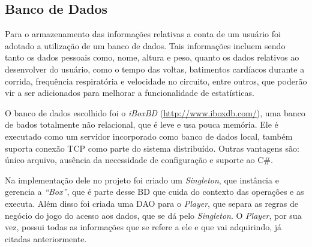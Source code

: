 \subsection{Banco de Dados}
Para o armazenamento das informações relativas a conta de um usuário foi adotado a utilização de um banco de dados. Tais informações incluem sendo tanto os dados pessoais como, nome, altura e peso, quanto os dados relativos ao desenvolver do usuário, como o tempo das voltas, batimentos cardíacos durante a corrida, frequência respiratória e velocidade no circuito, entre outros, que poderão vir a ser adicionados para melhorar a funcionalidade de estatísticas.

O banco de dados escolhido foi o \textit{iBoxBD} (\url{http://www.iboxdb.com/}), uma banco de bados totalmente não relacional, que é leve e usa pouca memória. Ele é executado como um servidor incorporado como banco de dados local, também suporta conexão TCP como parte do sistema distribuído. Outras vantagens são: único arquivo, ausência da necessidade de configuração e suporte ao C\#.

Na implementação dele no projeto foi criado um \textit{Singleton}, que instância e gerencia a \textit{“Box”}, que é parte desse BD que cuida do contexto das operações e as executa. Além disso foi criada uma DAO para o \textit{Player}, que separa as regras de negócio do jogo do acesso aos dados, que se dá pelo \textit{Singleton}. O \textit{Player}, por sua vez, possui todas as informações que se refere a ele e que vai adquirindo, já citadas anteriormente.
